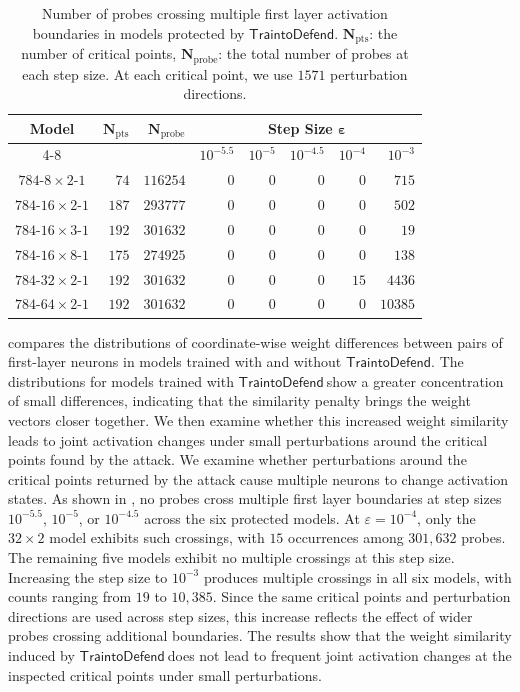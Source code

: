 \documentclass[runningheads]{llncs}
\newcommand{\td}{$\mathsf{Train to Defend}~$}
\newcommand{\nospacetd}{$\mathsf{Train to Defend}$}
\begin{document}
\begin{table}[t]
\centering
\setlength{\tabcolsep}{3pt}
\caption{Number of probes crossing multiple first layer activation boundaries in models protected by $\mathsf{TraintoDefend}.$
$\bm N_{\mathrm{pts}}$: the number of critical points, $\bm N_{\mathrm{probe}}$: the total number of probes at each step size.
At each critical point, we use $1571$ perturbation directions.}
\label{tab:joint-activation}
\begin{tabular}{crrrrrrr}
\toprule
\multirow{2}{*}{\bfseries Model}
& \multirow{2}{*}{$\bm N_{\mathrm{pts}}$}
& \multirow{2}{*}{\bfseries$\bm N_{\mathrm{probe}}$}
& \multicolumn{5}{c}{\bfseries Step Size $\bm \varepsilon$} \\
\cmidrule(lr){4-8}
& & & $10^{-5.5}$ & $10^{-5}$ & $10^{-4.5}$ & $10^{-4}$ & $10^{-3}$ \\
\midrule
${784\text{-}8\times2\text{-}1}$  & $74$  & $116254$ & $0$ & $0$ & $0$ & $0$  & $715$ \\
${784\text{-}16\times2\text{-}1}$ & $187$ & $293777$ & $0$ & $0$ & $0$ & $0$  & $502$ \\
${784\text{-}16\times3\text{-}1}$ & $192$ & $301632$ & $0$ & $0$ & $0$ & $0$  & $19$ \\
${784\text{-}16\times8\text{-}1}$ & $175$ & $274925$ & $0$ & $0$ & $0$ & $0$  & $138$ \\
${784\text{-}32\times2\text{-}1}$ & $192$ & $301632$ & $0$ & $0$ & $0$ & $15$ & $4436$ \\
${784\text{-}64\times2\text{-}1}$ & $192$ & $301632$ & $0$ & $0$ & $0$ & $0$  & $10385$ \\
\bottomrule
\end{tabular}
\end{table}

 compares the distributions of coordinate-wise weight differences between pairs of first-layer neurons in models trained with and without \nospacetd.
The distributions for models trained with \td show a greater concentration of small differences, indicating that the similarity penalty brings the weight vectors closer together.
We then examine whether this increased weight similarity leads to joint activation changes under small perturbations around the critical points found by the attack.
We examine whether perturbations around the critical points returned by the attack cause multiple neurons to change activation states.
As shown in , no probes cross multiple first layer boundaries at step sizes $10^{-5.5}$, $10^{-5}$, or $10^{-4.5}$ across the six protected models.
At $\varepsilon=10^{-4}$, only the $32\times2$ model exhibits such crossings, with $15$ occurrences among $301{,}632$ probes.
The remaining five models exhibit no multiple crossings at this step size.
Increasing the step size to $10^{-3}$ produces multiple crossings in all six models, with counts ranging from $19$ to $10{,}385$.
Since the same critical points and perturbation directions are used across step sizes, this increase reflects the effect of wider probes crossing additional boundaries.
The results show that the weight similarity induced by \td does not lead to frequent joint activation changes at the inspected critical points under small perturbations.
\end{document}
